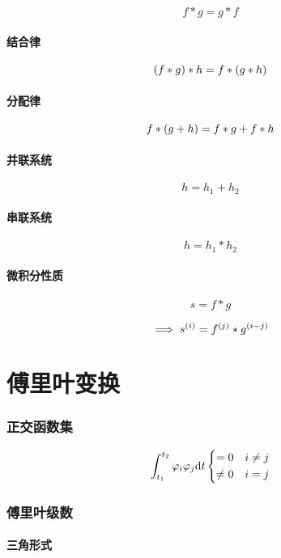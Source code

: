 \documentclass{article}
\begin{document}
\[f\ast g=g\ast f\]

\subsection{结合律}

\[\left(f\ast g\right)\ast h=f\ast\left(g\ast h\right)\]

\subsection{分配律}

\[f\ast\left(g+h\right)=f\ast g+f\ast h\]

\subsection{并联系统}

\[h=h_1+h_2\]

\subsection{串联系统}

\[h=h_1\ast h_2\]

\subsection{微积分性质}

\[s=f\ast g\]

\[\implies s^{\left(i\right)}=f^{\left(j\right)}\ast g^{\left(i-j\right)}\]

\part{傅里叶变换}

\section{正交函数集}

\[\int_{t_1}^{t_2}\varphi_i\varphi_j\mathrm d t
    \left\{\begin{aligned}
        =0    &  & i\neq j \\
        \neq0 &  & i=j
    \end{aligned}\right.\]

\section{傅里叶级数}

\subsection{三角形式}
\end{document}
